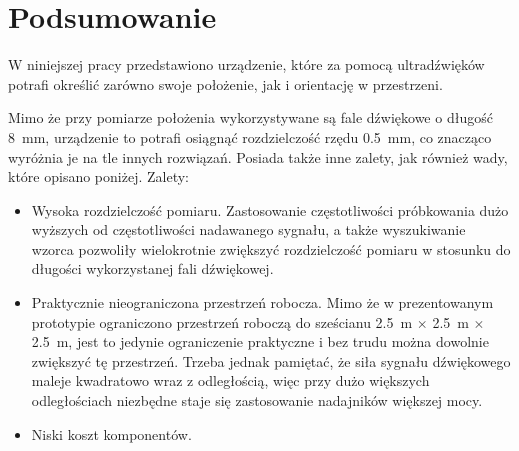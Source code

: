 \chapter{Podsumowanie}

W niniejszej pracy przedstawiono urządzenie, które za pomocą ultradźwięków  potrafi określić zarówno swoje
położenie, jak i orientację w przestrzeni.

Mimo że przy pomiarze położenia wykorzystywane są fale dźwiękowe o długość \SI{8}{mm}, urządzenie to
potrafi osiągnąć rozdzielczość  rzędu \SI{0,5}{mm}, co znacząco wyróżnia je na tle innych rozwiązań.
Posiada także inne zalety, jak również wady, które opisano poniżej.
\newline
Zalety:
\begin{itemize}
 \item Wysoka rozdzielczość pomiaru. Zastosowanie częstotliwości 
 próbkowania dużo wyższych od częstotliwości nadawanego sygnału, a także wyszukiwanie wzorca pozwoliły
 wielokrotnie zwiększyć rozdzielczość pomiaru w stosunku do długości wykorzystanej fali dźwiękowej.
 
 \item Praktycznie nieograniczona przestrzeń robocza. Mimo że w prezentowanym prototypie
 ograniczono przestrzeń roboczą do sześcianu \SI{2,5}{m} $\times$ \SI{2,5}{m} $\times$ \SI{2,5}{m},
 jest to jedynie ograniczenie praktyczne i bez trudu można dowolnie zwiększyć tę przestrzeń. Trzeba jednak 
 pamiętać, że siła sygnału dźwiękowego maleje kwadratowo wraz z odległością, więc przy dużo większych odległościach
 niezbędne staje się zastosowanie nadajników większej mocy. 
 
 \item Niski koszt komponentów.
\end{itemize}

